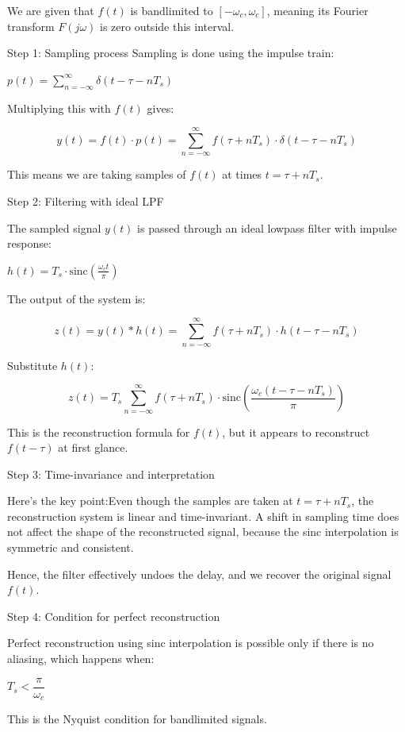 \documentclass[11pt,a4paper]{article}
\begin{document}
\begin{tcolorbox}[solbox, title=Detailed Solution -- Question 11]
We are given that $f(t)$ is bandlimited to $[-\omega_c, \omega_c]$, meaning its Fourier transform $F(j\omega)$ is zero outside this interval.

Step 1: Sampling process
Sampling is done using the impulse train:

$p(t) = \sum_{n=-\infty}^{\infty} \delta(t - \tau - nT_s)$

Multiplying this with $f(t)$ gives:

\[
y(t) = f(t) \cdot p(t) = \sum_{n=-\infty}^{\infty} f(\tau + nT_s) \cdot \delta(t - \tau - nT_s)
\]

This means we are taking samples of $f(t)$ at times $t = \tau + nT_s$.

Step 2: Filtering with ideal LPF

The sampled signal $y(t)$ is passed through an ideal lowpass filter with impulse response:

$h(t) = T_s \cdot \text{sinc}\left(\frac{\omega_c t}{\pi}\right)$

The output of the system is:

\[
z(t) = y(t) * h(t) = \sum_{n=-\infty}^{\infty} f(\tau + nT_s) \cdot h(t - \tau - nT_s)
\]

Substitute $h(t)$:

\[
z(t) = T_s \sum_{n=-\infty}^{\infty} f(\tau + nT_s) \cdot \text{sinc}\left(\frac{\omega_c (t - \tau - nT_s)}{\pi}\right)
\]

This is the reconstruction formula for $f(t)$, but it appears to reconstruct $f(t - \tau)$ at first glance.

Step 3: Time-invariance and interpretation

Here's the key point:Even though the samples are taken at $t = \tau + nT_s$, the reconstruction system is linear and time-invariant. A shift in sampling time does not affect the shape of the reconstructed signal, because the sinc interpolation is symmetric and consistent.

Hence, the filter effectively undoes the delay, and we recover the original signal $f(t)$.

Step 4: Condition for perfect reconstruction

Perfect reconstruction using sinc interpolation is possible only if there is no aliasing, which happens when:

$T_s < \dfrac{\pi}{\omega_c}$

This is the Nyquist condition for bandlimited signals.
\end{tcolorbox}
\end{document}
